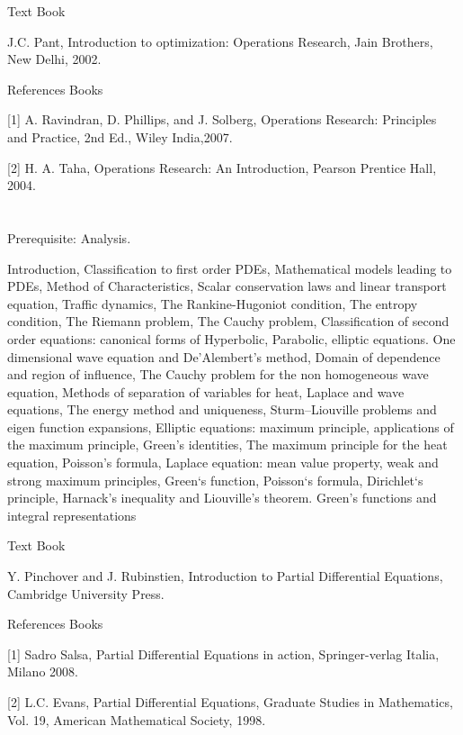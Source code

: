 Text Book

J.C. Pant, Introduction to optimization: Operations Research, Jain Brothers, New Delhi, 2002.

References Books

[1] A. Ravindran, D. Phillips, and J. Solberg, Operations Research: Principles and Practice, 2nd Ed., Wiley India,2007.

[2] H. A. Taha, Operations Research: An Introduction, Pearson Prentice Hall, 2004.



\section{\courseinfo}

Prerequisite: Analysis.  

Introduction, Classification to first order PDEs, Mathematical models leading to PDEs, Method of Characteristics, Scalar conservation laws and linear transport equation, Traffic dynamics, The Rankine-Hugoniot condition, The entropy condition, The Riemann problem, The Cauchy problem, Classification of second order equations: canonical forms of Hyperbolic, Parabolic, elliptic equations. One dimensional wave equation and De’Alembert’s method, Domain of dependence and region of influence, The Cauchy problem for the non homogeneous wave equation, Methods of separation of variables for heat, Laplace and wave equations, The energy method and uniqueness, Sturm–Liouville problems and eigen function expansions, Elliptic equations: maximum principle, applications of the maximum principle, Green’s identities, The maximum principle for the heat equation, Poisson’s formula, Laplace equation: mean value property, weak and strong maximum principles, Green`s function, Poisson`s formula, Dirichlet`s principle, Harnack’s inequality and Liouville’s theorem. Green’s functions and integral representations

Text Book

Y. Pinchover and J. Rubinstien, Introduction to Partial Differential Equations, Cambridge University Press.

References Books 

[1] Sadro Salsa, Partial Differential Equations in action, Springer-verlag Italia, Milano 2008.

  	[2] L.C. Evans, Partial Differential Equations, Graduate Studies in Mathematics, Vol. 19, American Mathematical Society, 1998.


